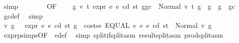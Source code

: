 \begin{isabellebody}
\ simp\isanewline
\ \ \ \ \ \ \isamarkupfalse%
\ {}{}{\isacharparenleft}{\kern0pt}{}{\isacharparenright}{\kern0pt}{\isacharbrackleft}{\kern0pt}OF\ {\isacharasterisk}{\kern0pt}\ {\isacharasterisk}{\kern0pt}{\isacharasterisk}{\kern0pt}{\isacharbrackright}{\kern0pt}\ \isamarkupfalse%
\ {\isachardoublequoteopen}{\isasymAnd}g{}{\isacharprime}{\kern0pt}\ v{}\ t{}{\isachardot}{\kern0pt}\ expr\ e{}\ e\ cd\ st\ {\isacharparenleft}{\kern0pt}g{\isacharminus}{\kern0pt}gc{\isacharparenright}{\kern0pt}\ {\isacharequal}{\kern0pt}\ Normal\ {\isacharparenleft}{\kern0pt}{\isacharparenleft}{\kern0pt}v{}{\isacharcomma}{\kern0pt}\ t{}{\isacharparenright}{\kern0pt}{\isacharcomma}{\kern0pt}\ g{}{\isacharprime}{\kern0pt}{\isacharparenright}{\kern0pt}\ {\isasymLongrightarrow}\ g{}{\isacharprime}{\kern0pt}\ {\isasymle}\ g\ {\isacharminus}{\kern0pt}\ gc{\isachardoublequoteclose}\ \isamarkupfalse%
\ gc{\isacharunderscore}{\kern0pt}def\ \isamarkupfalse%
\ simp\isanewline
\ \ \ \ \ \ \isamarkupfalse%
\ \isamarkupfalse%
\ v\ g{\isacharprime}{\kern0pt}\ \ {\isacharasterisk}{\kern0pt}{\isacharasterisk}{\kern0pt}{\isacharasterisk}{\kern0pt}{\isacharcolon}{\kern0pt}\ {\isachardoublequoteopen}expr\ e{}\ e\ cd\ st\ {\isacharparenleft}{\kern0pt}g\ {\isacharminus}{\kern0pt}\ costs\isactrlsub e\ {\isacharparenleft}{\kern0pt}EQUAL\ e{}\ e{}{\isacharparenright}{\kern0pt}\ e\ cd\ st{\isacharparenright}{\kern0pt}\ {\isacharequal}{\kern0pt}\ Normal\ {\isacharparenleft}{\kern0pt}v{\isacharcomma}{\kern0pt}\ g{\isacharprime}{\kern0pt}{\isacharparenright}{\kern0pt}{\isachardoublequoteclose}\ \isamarkupfalse%
\ expr{\isachardot}{\kern0pt}psimps{\isacharparenleft}{\kern0pt}{}{}{\isacharparenright}{\kern0pt}{\isacharbrackleft}{\kern0pt}OF\ {}{}{\isacharparenleft}{\kern0pt}{}{\isacharparenright}{\kern0pt}{\isacharbrackright}{\kern0pt}\ e{\isacharunderscore}{\kern0pt}def\ \isamarkupfalse%
\ {\isacharparenleft}{\kern0pt}simp\ split{\isacharcolon}{\kern0pt}if{\isacharunderscore}{\kern0pt}split{\isacharunderscore}{\kern0pt}asm\ result{\isachardot}{\kern0pt}split{\isacharunderscore}{\kern0pt}asm\ prod{\isachardot}{\kern0pt}split{\isacharunderscore}{\kern0pt}asm{\isacharparenright}{\kern0pt}\isanewline
\ \ \ \ \ \ \isamarkupfalse%

\end{isabellebody}

